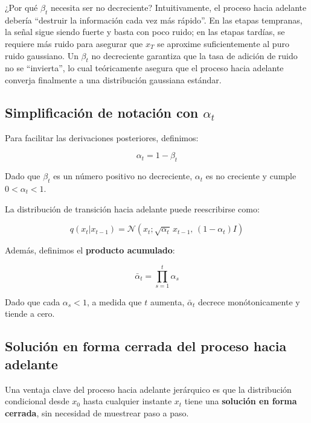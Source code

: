 \documentclass[a4paper]{article}
\begin{document}
\begin{knowledgebox}{¿Por qué $\beta_t$ necesita ser no decreciente?}
Intuitivamente, el proceso hacia adelante debería ``destruir la información cada vez más rápido''. En las etapas tempranas, la señal sigue siendo fuerte y basta con poco ruido; en las etapas tardías, se requiere más ruido para asegurar que $x_T$ se aproxime suficientemente al puro ruido gaussiano. Un $\beta_t$ no decreciente garantiza que la tasa de adición de ruido no se ``invierta'', lo cual teóricamente asegura que el proceso hacia adelante converja finalmente a una distribución gaussiana estándar.
\end{knowledgebox}

\subsection{Simplificación de notación con $\alpha_t$}

Para facilitar las derivaciones posteriores, definimos:

$$\alpha_t = 1 - \beta_t$$

Dado que $\beta_t$ es un número positivo no decreciente, $\alpha_t$ es no creciente y cumple $0 < \alpha_t < 1$.

La distribución de transición hacia adelante puede reescribirse como:

$$q(x_t | x_{t-1}) = \mathcal{N}(x_t; \sqrt{\alpha_t} \, x_{t-1}, \, (1 - \alpha_t) I)$$

Además, definimos el \textbf{producto acumulado}:

$$\bar{\alpha}_t = \prod_{s=1}^{t} \alpha_s$$

Dado que cada $\alpha_s < 1$, a medida que $t$ aumenta, $\bar{\alpha}_t$ decrece monótonicamente y tiende a cero.

\subsection{Solución en forma cerrada del proceso hacia adelante}

Una ventaja clave del proceso hacia adelante jerárquico es que la distribución condicional desde $x_0$ hasta cualquier instante $x_t$ tiene una \textbf{solución en forma cerrada}, sin necesidad de muestrear paso a paso.

\end{document}
